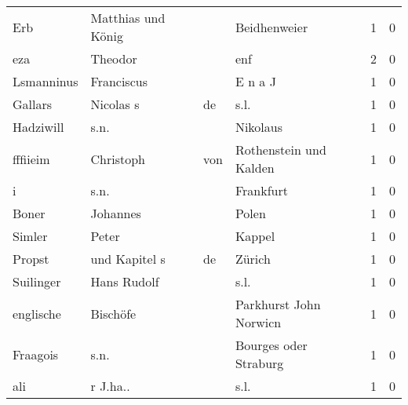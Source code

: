 \begin{tabular}{llllrr}
                      Erb &                 Matthias und König &             &                                Beidhenweier &          1 &         0 \\
                      eza &                            Theodor &             &                                         enf &          2 &         0 \\
               Lsmanninus &                         Franciscus &             &                                     E n a J &          1 &         0 \\
                  Gallars &                          Nicolas s &          de &                                        s.l. &          1 &         0 \\
                Hadziwill &                               s.n. &             &                                    Nikolaus &          1 &         0 \\
                 fffiieim &                          Christoph &         von &                      Rothenstein und Kalden &          1 &         0 \\
                        i &                               s.n. &             &                                   Frankfurt &          1 &         0 \\
                    Boner &                           Johannes &             &                                       Polen &          1 &         0 \\
                   Simler &                              Peter &             &                                      Kappel &          1 &         0 \\
                   Propst &                      und Kapitel s &          de &                                      Zürich &          1 &         0 \\
                Suilinger &                        Hans Rudolf &             &                                        s.l. &          1 &         0 \\
                englische &                           Bischöfe &             &                      Parkhurst John Norwicn &          1 &         0 \\
                 Fraagois &                               s.n. &             &                       Bourges oder Straburg &          1 &         0 \\
                      ali &                           r J.ha.. &             &                                        s.l. &          1 &         0 \\

\end{tabular}
